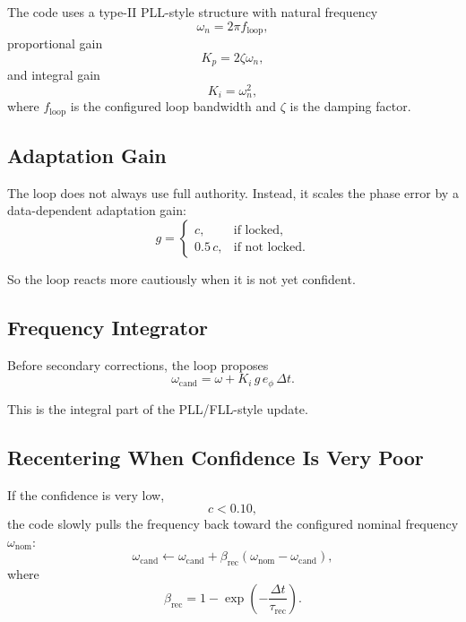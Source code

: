 \documentclass[conference]{IEEEtran}
\begin{document}
    The code uses a type-II PLL-style structure with natural frequency
    \begin{equation}
        \omega_n = 2\pi f_{\mathrm{loop}},
    \end{equation}
    proportional gain
    \begin{equation}
        K_p = 2\zeta \omega_n,
    \end{equation}
    and integral gain
    \begin{equation}
        K_i = \omega_n^2,
    \end{equation}
    where \(f_{\mathrm{loop}}\) is the configured loop bandwidth and \(\zeta\) is
    the damping factor.

    \subsection{Adaptation Gain}

    The loop does not always use full authority. Instead, it scales the phase
    error by a data-dependent adaptation gain:
    \begin{equation}
        g =
        \begin{cases}
            c, & \text{if locked},\\[4pt]
            0.5\,c, & \text{if not locked}.
        \end{cases}
    \end{equation}

    So the loop reacts more cautiously when it is not yet confident.

    \subsection{Frequency Integrator}

    Before secondary corrections, the loop proposes
    \begin{equation}
        \omega_{\mathrm{cand}}
        =
        \omega + K_i\,g\,e_\phi\,\Delta t.
    \end{equation}

    This is the integral part of the PLL/FLL-style update.

    \subsection{Recentering When Confidence Is Very Poor}

    If the confidence is very low,
    \begin{equation}
        c < 0.10,
    \end{equation}
    the code slowly pulls the frequency back toward the configured nominal
    frequency \(\omega_{\mathrm{nom}}\):
    \begin{equation}
        \omega_{\mathrm{cand}}
        \leftarrow
        \omega_{\mathrm{cand}}
        +
        \beta_{\mathrm{rec}}
        (\omega_{\mathrm{nom}} - \omega_{\mathrm{cand}}),
    \end{equation}
    where
    \begin{equation}
        \beta_{\mathrm{rec}} = 1 - \exp\!\left(-\frac{\Delta t}{\tau_{\mathrm{rec}}}\right).
    \end{equation}
\end{document}
